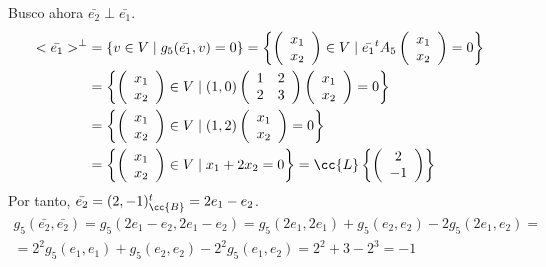 \begin{ejercicio}
\begin{enumerate}
        Busco ahora $\bar{e_2} \perp \bar{e_1}$.
        \begin{equation*}\begin{split}
            <\bar{e_1}>^\perp &= \{v \in V \mid g_5(\bar{e_1},v) = 0\} 
            = \left\{ \left(\begin{array}{c}
                 x_1 \\ x_2
            \end{array} \right) \in V \mid \bar{e_1}^t A_5
            \left(\begin{array}{c}
                 x_1 \\ x_2
            \end{array} \right) = 0\right\} \\
            &= \left\{ \left(\begin{array}{c}
                 x_1 \\ x_2
            \end{array} \right) \in V \mid (1,0)\left(\begin{array}{cc}
                1 & 2 \\
                2 & 3
            \end{array} \right) 
            \left(\begin{array}{c}
                 x_1 \\ x_2
            \end{array} \right) = 0\right\} \\
            &= \left\{ \left(\begin{array}{c}
                 x_1 \\ x_2
            \end{array} \right) \in V \mid (1,2)
            \left(\begin{array}{c}
                 x_1 \\ x_2
            \end{array} \right) = 0\right\} \\
            &= \left\{ \left(\begin{array}{c}
                 x_1 \\ x_2
            \end{array} \right) \in V \mid x_1+2x_2 = 0\right\}
            = \cc{L} \left\{ \left(\begin{array}{c}
                 2 \\ -1
            \end{array} \right) \right\}
        \end{split}\end{equation*}
        Por tanto, $\bar{e_2} = (2,-1)^t_\cc{B} = 2e_1-e_2$.
        \begin{multline*}
            g_5(\bar{e_2}, \bar{e_2}) = g_5(2e_1-e_2, 2e_1-e_2) = g_5(2e_1,2e_1) + g_5(e_2,e_2) - 2g_5(2e_1, e_2)
            =\\=
            2^2g_5(e_1, e_1) + g_5(e_2,e_2)-2^2g_5(e_1, e_2) = 2^2 + 3-2^3 = -1
        \end{multline*}


\end{enumerate}
\end{ejercicio}
